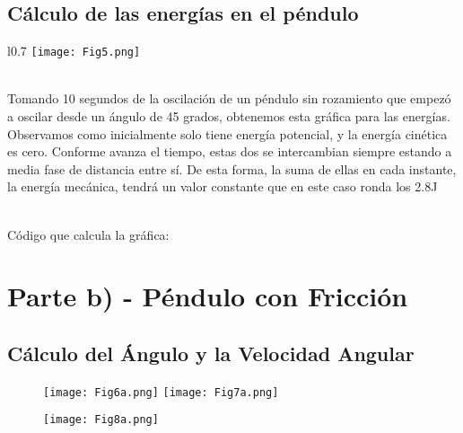 \documentclass{article}
\begin{document}

\subsection{Cálculo de las energías en el péndulo}

\begin{wrapfigure}{l}{0.7\textwidth}
\centering
\texttt{[image: Fig5.png]}
\end{wrapfigure}

\hfill \break \\
Tomando 10 segundos de la oscilación de un péndulo sin rozamiento que empezó a oscilar desde un ángulo de 45 grados, obtenemos esta gráfica para las energías. Observamos como inicialmente solo tiene energía potencial, y la energía cinética es cero. Conforme avanza el tiempo, estas dos se intercambian siempre estando a media fase de distancia entre sí. De esta forma, la suma de ellas en cada instante, la energía mecánica, tendrá un valor constante que en este caso ronda los 2.8J

\hfill \break \\
Código que calcula la gráfica:

\pagebreak

\section{Parte b) - Péndulo con Fricción}

\subsection{Cálculo del Ángulo y la Velocidad Angular}
\begin{figure}[h]
\centering
\hspace*{-2.3cm}
\texttt{[image: Fig6a.png]}\hfill
\texttt{[image: Fig7a.png]}
\hspace*{-2.3cm}
\end{figure}
\begin{figure}[h]
\centering
\texttt{[image: Fig8a.png]}
\end{figure}
\end{document}
